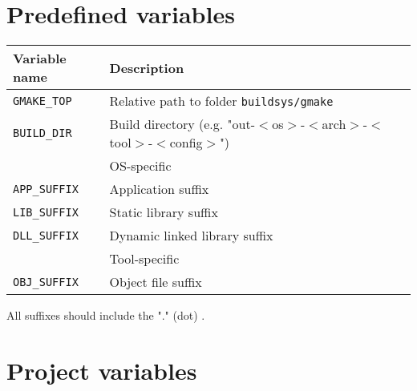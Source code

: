 \documentclass{article}
\newcommand{\var}[1]{{\tt #1}}
\newcommand{\file}[1]{{\tt #1}}
\begin{document}
\section{Predefined variables}

\begin{tabular}{ll}
Variable name		& Description		\\
\hline
\var{GMAKE\_TOP}	& Relative path to folder \file{buildsys/gmake} \\
\var{BUILD\_DIR}	& Build directory (e.g. "out-$<$os$>$-$<$arch$>$-$<$tool$>$-$<$config$>$")\\
\hline
& OS-specific \\
\hline
\var{APP\_SUFFIX} & Application suffix            \\
\var{LIB\_SUFFIX} & Static library suffix         \\
\var{DLL\_SUFFIX} & Dynamic linked library suffix \\
\hline
& Tool-specific \\
\hline
\var{OBJ\_SUFFIX} & Object file suffix            \\
\end{tabular}

All suffixes should include the "." (dot) .

\section{Project variables}
\end{document}
